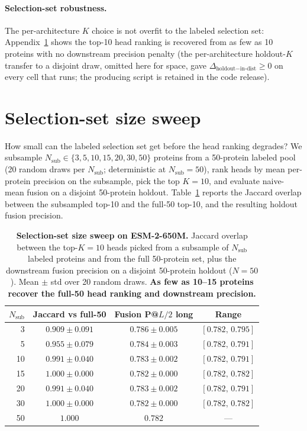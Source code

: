 \documentclass{article}
\begin{document}
\paragraph{Selection-set robustness.}
The per-architecture $K$ choice is not overfit to the labeled selection set:
Appendix~\ref{app:selection-size} shows the top-10 head ranking is recovered
from as few as 10 proteins with no downstream precision penalty (the
per-architecture holdout-$K$ transfer to a disjoint draw, omitted here for
space, gave $\Delta_{\text{holdout}-\text{in-dist}} \geq 0$ on every cell that
runs; the producing script is retained in the code release).


\section{Selection-set size sweep}
\label{app:selection-size}

How small can the labeled selection set get before the head ranking
degrades? We subsample $N_{\mathrm{sub}} \in \{3, 5, 10, 15, 20, 30,
50\}$ proteins from a 50-protein labeled pool (20 random draws per
$N_{\mathrm{sub}}$; deterministic at $N_{\mathrm{sub}}{=}50$), rank
heads by mean per-protein precision on the subsample, pick the top
$K{=}10$, and evaluate naive-mean fusion on a disjoint 50-protein
holdout. Table~\ref{tab:selection-size} reports the Jaccard
overlap between the subsampled top-10 and the full-50 top-10, and the
resulting holdout fusion precision.

\begin{table}[h]
\centering
\small
\caption{\textbf{Selection-set size sweep on ESM-2-650M.} Jaccard
overlap between the top-$K{=}10$ heads picked from a subsample of
$N_{\mathrm{sub}}$ labeled proteins and from the full 50-protein set,
plus the downstream fusion precision on a disjoint 50-protein
holdout ($N{=}50$). Mean $\pm$ std over 20 random draws. \textbf{As
few as 10--15 proteins recover the full-50 head ranking and downstream
precision.}}
\label{tab:selection-size}
\begin{tabular}{rccc}
\toprule
$N_{\mathrm{sub}}$ & Jaccard vs full-50 & Fusion P@$L/2$ long & Range \\
\midrule
3  & $0.909 \pm 0.091$ & $0.786 \pm 0.005$ & $[0.782,\, 0.795]$ \\
5  & $0.955 \pm 0.079$ & $0.784 \pm 0.003$ & $[0.782,\, 0.791]$ \\
10 & $0.991 \pm 0.040$ & $0.783 \pm 0.002$ & $[0.782,\, 0.791]$ \\
15 & $1.000 \pm 0.000$ & $0.782 \pm 0.000$ & $[0.782,\, 0.782]$ \\
20 & $0.991 \pm 0.040$ & $0.783 \pm 0.002$ & $[0.782,\, 0.791]$ \\
30 & $1.000 \pm 0.000$ & $0.782 \pm 0.000$ & $[0.782,\, 0.782]$ \\
50 & $1.000$ & $0.782$ & --- \\
\bottomrule
\end{tabular}
\end{table}
\end{document}
